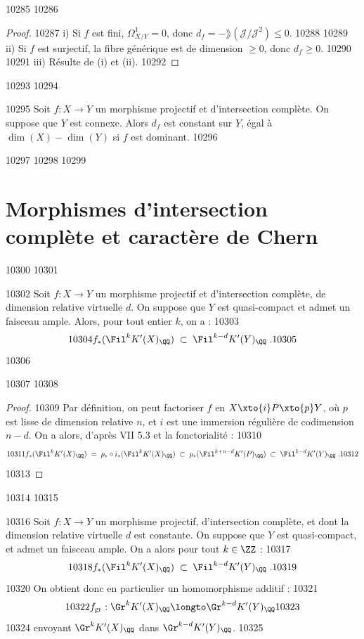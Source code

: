  10285	
 10286	\begin{proof}
 10287	i) Si $f$ est fini, $\Omega^1_{X/Y} = 0$, donc $d_f = -\rang(\mathscr{J}/\mathscr{J}^2) \leq 0$.
 10288	
 10289	ii) Si $f$ est surjectif, la fibre générique est de dimension $\geq 0$, donc $d_f \geq 0$.
 10290	
 10291	iii) Résulte de (i) et (ii).
 10292	\end{proof}
 10293	
 10294	\begin{remarque}[2.6]%
 10295	Soit $f : X \to Y$ un morphisme projectif et d'intersection complète. On suppose que $Y$ est connexe. Alors $d_f$ est constant sur $Y$, égal à $\dim(X) - \dim(Y)$ si $f$ est dominant.
 10296	\end{remarque}
 10297	
 10298	
 10299	\section{Morphismes d'intersection complète et caractère de Chern}
 10300	
 10301	\begin{proposition}[3.1]%
 10302	Soit $f : X \to Y$ un morphisme projectif et d'intersection complète, de dimension relative virtuelle $d$. On suppose que $Y$ est quasi-compact et admet un faisceau ample. Alors, pour tout entier $k$, on a :
 10303	\[
 10304	f_*(\Fil^k K'(X)_{\QQ}) \; \subset \; \Fil^{k-d} K'(Y)_{\QQ}\; .
 10305	\]
 10306	\end{proposition}
 10307	
 10308	\begin{proof}
 10309	Par définition, on peut factoriser $f$ en $X \xto{i} P \xto{p} Y$, où $p$ est lisse de dimension relative $n$, et $i$ est une immersion régulière de codimension $n-d$. On a alors, d'après VII 5.3 et la fonctorialité :
 10310	\[
 10311	f_*(\Fil^k K'(X)_{\QQ}) \; = \; p_* \circ i_*(\Fil^k K'(X)_{\QQ}) \; \subset \; p_*(\Fil^{k+n-d} K'(P)_{\QQ}) \; \subset \; \Fil^{k-d} K'(Y)_{\QQ}\; .
 10312	\]
 10313	\end{proof}
 10314	
 10315	\begin{proposition}[3.2]%
 10316	Soit $f : X \to Y$ un morphisme projectif, d'intersection complète, et dont la dimension relative virtuelle $d$ est constante. On suppose que $Y$ est quasi-compact, et admet un faisceau ample. On a alors pour tout $k \in \ZZ$ :
 10317	\[
 10318	f_*(\Fil^k K'(X)_{\QQ}) \; \subset \; \Fil^{k-d} K'(Y)_{\QQ}\; .
 10319	\]
 10320	On obtient donc en particulier un homomorphisme additif :
 10321	\[
 10322	f_{\mathrm{gr}} : \Gr^k K'(X)_{\QQ} \longto \Gr^{k-d} K'(Y)_{\QQ}
 10323	\]
 10324	envoyant $\Gr^k K'(X)_{\QQ}$ dans $\Gr^{k-d} K'(Y)_{\QQ}$.
 10325	\end{proposition}
